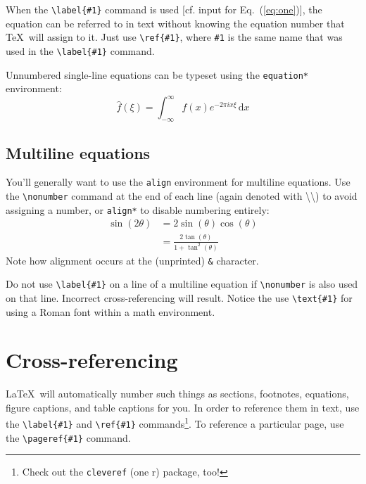 \documentclass[]{article}
\begin{document}
When the \verb+\label{#1}+ command is used [cf. input for Eq.~(\ref{eq:one})], the equation can be referred to in text without knowing the equation number that \TeX\ will assign to it. Just use \verb+\ref{#1}+, where \verb+#1+ is the same name that was used in the \verb+\label{#1}+ command.

Unnumbered single-line equations can be typeset using the \verb+equation*+ environment:
\begin{equation*}
  \hat{f}(\xi) = \int_{-\infty}^\infty f(x) e^{-2\pi i x \xi} \, \mathrm{d}x
\end{equation*}

\subsection{Multiline equations}

You'll generally want to use the \verb+align+ environment for multiline equations. Use the \verb+\nonumber+ command at the end of each line (again denoted with \textbackslash\textbackslash) to avoid assigning a number, or \verb+align*+ to disable numbering entirely:
\begin{align}
  \sin(2\theta) &= 2 \sin(\theta) \cos(\theta) \nonumber \\
                &= \frac{2\tan(\theta)}{1 + \tan^2(\theta)}
\end{align}
Note how alignment occurs at the (unprinted) \verb+&+ character.

Do not use \verb+\label{#1}+ on a line of a multiline equation if \verb+\nonumber+ is also used on that line. Incorrect cross-referencing will result. Notice the use \verb+\text{#1}+ for using a Roman font within a math environment.

\section{Cross-referencing}
\LaTeX\ will automatically number such things as sections, footnotes, equations, figure captions, and table captions for you. In order to reference them in text, use the \verb+\label{#1}+ and \verb+\ref{#1}+ commands\footnote{Check out the \texttt{cleveref} (one r) package, too!}. To reference a particular page, use the \verb+\pageref{#1}+ command.
\end{document}

